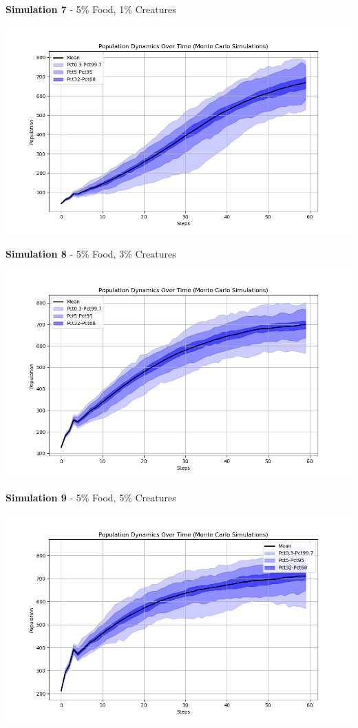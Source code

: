 \documentclass{article}
\begin{document}
\textbf{Simulation 7} - 5\% Food, 1\% Creatures
\begin{center}
    \includegraphics[scale=0.5]{tests/7_population_dynamics.png}
\end{center}
\textbf{Simulation 8} - 5\% Food, 3\% Creatures
\begin{center}
    \includegraphics[scale=0.5]{tests/8_population_dynamics.png}
\end{center}
\textbf{Simulation 9} - 5\% Food, 5\% Creatures
\begin{center}
    \includegraphics[scale=0.5]{tests/9_population_dynamics.png}
\end{center}
\end{document}
